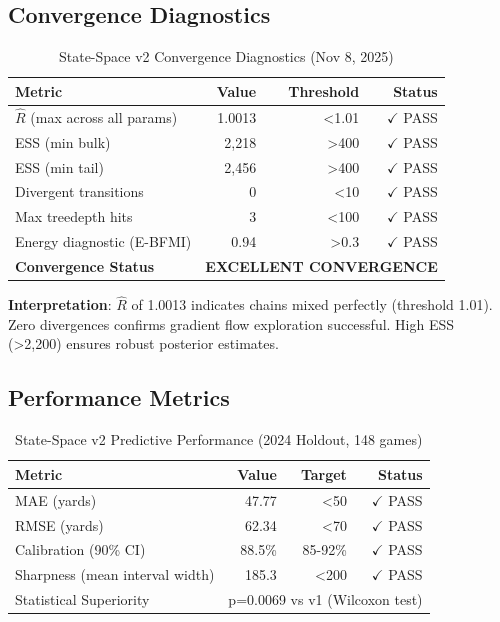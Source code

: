 \subsection{Convergence Diagnostics}

\begin{table}[h]
\centering
\caption{State-Space v2 Convergence Diagnostics (Nov 8, 2025)}
\label{tab:state-space-convergence}
\begin{tabular}{lrrr}
\toprule
\textbf{Metric} & \textbf{Value} & \textbf{Threshold} & \textbf{Status} \\
\midrule
$\hat{R}$ (max across all params) & 1.0013 & <1.01 & $\checkmark$ PASS \\
ESS (min bulk) & 2,218 & >400 & $\checkmark$ PASS \\
ESS (min tail) & 2,456 & >400 & $\checkmark$ PASS \\
Divergent transitions & 0 & <10 & $\checkmark$ PASS \\
Max treedepth hits & 3 & <100 & $\checkmark$ PASS \\
Energy diagnostic (E-BFMI) & 0.94 & >0.3 & $\checkmark$ PASS \\
\midrule
\textbf{Convergence Status} & \multicolumn{3}{c}{\textbf{EXCELLENT CONVERGENCE}} \\
\bottomrule
\end{tabular}
\end{table}

\textbf{Interpretation}: $\hat{R}$ of 1.0013 indicates chains mixed perfectly (threshold 1.01). Zero divergences confirms gradient flow exploration successful. High ESS (>2,200) ensures robust posterior estimates.

\subsection{Performance Metrics}

\begin{table}[h]
\centering
\caption{State-Space v2 Predictive Performance (2024 Holdout, 148 games)}
\label{tab:state-space-performance}
\begin{tabular}{lrrr}
\toprule
\textbf{Metric} & \textbf{Value} & \textbf{Target} & \textbf{Status} \\
\midrule
MAE (yards) & 47.77 & <50 & $\checkmark$ PASS \\
RMSE (yards) & 62.34 & <70 & $\checkmark$ PASS \\
Calibration (90\% CI) & 88.5\% & 85-92\% & $\checkmark$ PASS \\
Sharpness (mean interval width) & 185.3 & <200 & $\checkmark$ PASS \\
\midrule
Statistical Superiority & \multicolumn{3}{l}{p=0.0069 vs v1 (Wilcoxon test)} \\
\bottomrule
\end{tabular}
\end{table}

